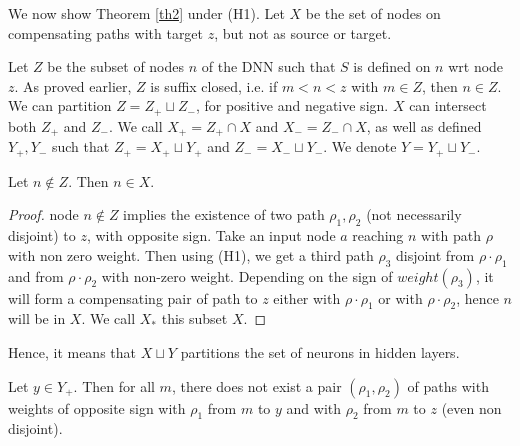 			\smallskip


			We now show Theorem \ref{th2} under (H1).
			Let $X$ be the set of nodes on compensating paths with target $z$, but not as source or target.
		
			Let $Z$ be the subset of nodes $n$ of the DNN such that $S$ is defined on $n$ 
			wrt node $z$. As proved earlier, $Z$ is suffix closed, i.e. if $m<n<z$ with $m \in Z$, then $n \in Z$. We can partition $Z = Z_{+} \sqcup Z_{-}$, for positive and negative sign. $X$ can intersect both $Z_+$ and $Z_-$.
			We call $X_+ = Z_+ \cap X$ and $X_-=Z_- \cap X$, as well as 
			defined $Y_+,Y_-$ such that $Z_+ = X_+ \sqcup Y_+$ and $Z_- = X_- \sqcup Y_-$.
			We denote $Y=Y_+ \sqcup Y_-$.
			
\begin{lemma}
 Let $n \notin Z$. Then $n \in X$.
\end{lemma}

\begin{proof}
			node $n \notin Z$ implies the existence of two path $\rho_1,\rho_2$ (not necessarily disjoint) to $z$, with opposite sign. 
			Take an input node $a$ reaching $n$ with path $\rho$ with non zero weight.
			Then using (H1), we get a third path $\rho_3$ disjoint from $\rho \cdot \rho_1$ and from $\rho \cdot \rho_2$ with non-zero weight. Depending on the sign of $weight(\rho_3)$, it will form a compensating pair of path to $z$ either with $\rho \cdot \rho_1$ or with $\rho \cdot \rho_2$, hence $n$ will be in $X$. We call $X_*$ this subset $X$.
\end{proof}
			
Hence, it means that $X \sqcup Y$ partitions the set of neurons in hidden layers.
			
\begin{lemma}
	\label{lemma10}
		Let $y \in Y_+$. Then for all $m$, there does not exist a pair $(\rho_1,\rho_2)$ 
		of paths  with weights of opposite sign with $\rho_1$ from $m$ to $y$ and 
		with $\rho_2$ from $m$ to $z$ (even non disjoint).
\end{lemma}

